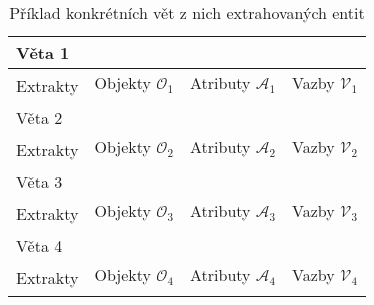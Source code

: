 \begin{table}[H]
	\begin{tabular}{|l|ccc|}
		\hline
		Věta 1                    & \multicolumn{3}{l|}{\senone}                                                                                            \\ \hline
		\multirow{2}{*}{Extrakty} & \multicolumn{1}{c|}{Objekty $\mathcal O_{1}$} & \multicolumn{1}{c|}{Atributy $\mathcal A_{1}$} & Vazby $\mathcal V_{1}$ \\ \cline{2-4}
		                          & \multicolumn{1}{l|}{\objone}                  & \multicolumn{1}{c|}{\attrone}                  & \tripone               \\ \hline
		\hline
		Věta 2                    & \multicolumn{3}{l|}{\sentwo}                                                                                            \\ \hline
		\multirow{2}{*}{Extrakty} & \multicolumn{1}{c|}{Objekty $\mathcal O_{2}$} & \multicolumn{1}{c|}{Atributy $\mathcal A_{2}$} & Vazby $\mathcal V_{2}$ \\ \cline{2-4}
		                          & \multicolumn{1}{l|}{\objtwo}                  & \multicolumn{1}{c|}{\attrtwo}                  & \triptwo               \\ \hline
		\hline
		Věta 3                    & \multicolumn{3}{l|}{\senthree}                                                                                          \\ \hline
		\multirow{2}{*}{Extrakty} & \multicolumn{1}{c|}{Objekty $\mathcal O_{3}$} & \multicolumn{1}{c|}{Atributy $\mathcal A_{3}$} & Vazby $\mathcal V_{3}$ \\ \cline{2-4}
		                          & \multicolumn{1}{l|}{\objthree}                & \multicolumn{1}{c|}{\attrthree}                & \tripthree             \\ \hline
		\hline
		Věta 4                    & \multicolumn{3}{l|}{\senfour}                                                                                           \\ \hline
		\multirow{2}{*}{Extrakty} & \multicolumn{1}{c|}{Objekty $\mathcal O_{4}$} & \multicolumn{1}{c|}{Atributy $\mathcal A_{4}$} & Vazby $\mathcal V_{4}$ \\ \cline{2-4}
		                          & \multicolumn{1}{l|}{\objfour}                 & \multicolumn{1}{c|}{\attrfour}                 & \tripfour              \\ \hline
	\end{tabular}
	\caption{Příklad konkrétních vět z nich extrahovaných entit}\label{tab:exmple_extracts}
\end{table}
